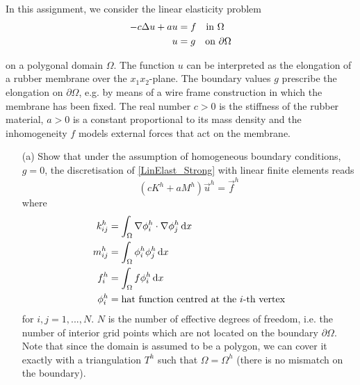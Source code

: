 




\begin{titlingpage}
	\titleGM
\end{titlingpage}
\clearpage
\setcounter{page}{1}

\begin{problem}{1}
In this assignment, we consider the linear elasticity problem
\begin{align}\label{LinElast_Strong}
\begin{split}
    -c \mbox{$\Delta$} u + au &= f \quad \text{in } \Omega \\
    u &= g \quad \text{on } \partial \Omega
\end{split}
\end{align}

on a polygonal domain $\Omega$. The function $u$ can be interpreted
as the elongation of a rubber membrane over the
$x_1x_2$-plane. The boundary values $g$ prescribe the elongation on 
$\partial\Omega$, e.g. by means of a wire frame construction
in which the membrane has been fixed. The real number $c > 0$
is the stiffness of the rubber material,
$a > 0$ is a constant proportional to its mass density and the
inhomogeneity $f$ models external forces that act on the membrane.

\begin{itemize}
	\item[(a)]  Show that under the assumption of homogeneous boundary
	conditions, $g = 0$, the discretisation of \eqref{LinElast_Strong}
	with linear finite elements reads
	$$(cK^h + aM^h)\vec{u}^h = \vec{f}^h$$
	where
	\begin{align*}
	    k_{ij}^h &= \int_{\Omega} \nabla\phi_i^h \cdot
	    \nabla\phi_j^h \operatorname{d}\!{x} \\
	    m_{ij}^h &= \int_{\Omega} \phi_i^h \phi_j^h \operatorname{d}\!{x} \\
	    f_i^h &= \int_{\Omega} f \phi_i^h \operatorname{d}\!{x} \\
	    \phi_i^h &= \text{hat function centred at the $i$-th vertex}
	\end{align*}
	for $i,j = 1,...,N$. $N$ is the number of effective
	degrees of freedom,
	i.e. the number of interior grid points
	which are not located on the boundary $\partial\Omega$.
	Note that since the domain is assumed to be a polygon,
	we can cover it exactly with a triangulation $T^h$
	such that $\Omega = \Omega^h$ (there is no mismatch on the boundary).    
\end{itemize}


\end{problem}
